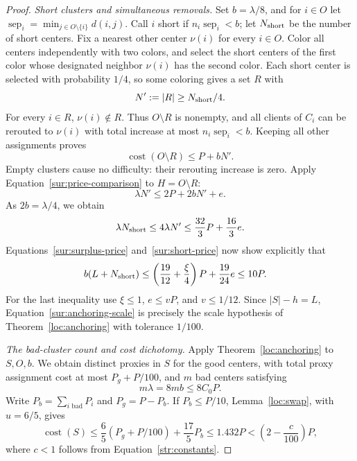\begin{proof}
\textit{Short clusters and simultaneous removals.}
Set $b=\lambda/8$, and for $i\in O$ let
$\operatorname{sep}_i=\min_{j\in O\setminus\{i\}}d(i,j)$.
Call $i$ short if $n_i\operatorname{sep}_i<b$; let $N_{\rm short}$
be the number of short centers.  Fix a nearest other center $\nu(i)$
for every $i\in O$.  Color all centers independently with two colors,
and select the short centers of the first color whose designated
neighbor $\nu(i)$ has the second color.  Each short center is selected
with probability $1/4$, so some coloring gives a set $R$ with
\[
 N':=|R|\ge N_{\rm short}/4.
\]
For every $i\in R$, $\nu(i)\notin R$.  Thus $O\setminus R$ is
nonempty, and all clients of $C_i$ can be rerouted to $\nu(i)$ with
total increase at most $n_i\operatorname{sep}_i<b$.  Keeping all other
assignments proves
\[
 \operatorname{cost}(O\setminus R)\le P+bN'.
\]
Empty clusters cause no difficulty: their rerouting increase is zero.
Apply Equation~\eqref{sur:price-comparison} to $H=O\setminus R$:
\[
 \lambda N'\le2P+2bN'+e.
\]
As $2b=\lambda/4$, we obtain
\begin{equation}\label{sur:short-price}
 \lambda N_{\rm short}\le4\lambda N'
 \le\frac{32}{3}P+\frac{16}{3}e.
\end{equation}
Equations~\eqref{sur:surplus-price} and~\eqref{sur:short-price} now
show explicitly that
\begin{align}
 b(L+N_{\rm short})
 &\le\left(\frac{19}{12}+\frac\xi4\right)P+\frac{19}{24}e
 \le10P.
 \label{sur:anchoring-scale}
\end{align}
For the last inequality use $\xi\le1$, $e\le vP$, and $v\le1/12$.
Since $|S|-h=L$, Equation~\eqref{sur:anchoring-scale} is precisely the
scale hypothesis of Theorem~\ref{loc:anchoring} with tolerance $1/100$.

\textit{The bad-cluster count and cost dichotomy.}
Apply Theorem~\ref{loc:anchoring} to $S,O,b$.  We obtain distinct proxies in $S$ for
the good centers, with total proxy assignment cost at most $P_g+P/100$,
and $m$ bad centers satisfying
\begin{equation}\label{sur:bad-price}
 m\lambda=8mb\le8C_0P.
\end{equation}
Write $P_b=\sum_{i\text{ bad}}P_i$ and $P_g=P-P_b$.
If $P_b\le P/10$, Lemma~\ref{loc:swap}, with $u=6/5$, gives
\[
 \operatorname{cost}(S)
 \le\frac65(P_g+P/100)+\frac{17}{5}P_b
 \le1.432P<\left(2-\frac c{100}\right)P,
\]
where $c<1$ follows from Equation~\eqref{str:constants}.


\end{proof}

